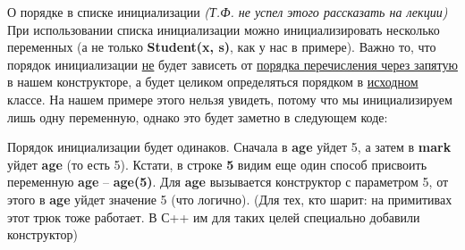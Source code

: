 \begin{lecture}[\lectureSubject]
\begin{lecSection}
			\begin{lecSubsection}{О порядке в списке инициализации}
			\textit{(Т.Ф. не успел этого рассказать на лекции)} При использовании списка инициализации можно инициализировать несколько переменных (а не только \textbf{Student(x, s)}, как у нас в примере). Важно то, что порядок инициализации \underline{не} будет зависеть от \underline{порядка перечисления через запятую} в нашем конструкторе, а будет целиком определяться порядком в \underline{исходном} классе. На нашем примере этого нельзя увидеть, потому что мы инициализируем лишь одну переменную, однако это будет заметно в следующем коде:
			\end{lecSubsection}
			Порядок инициализации будет одинаков. Сначала в \textbf{age} уйдет 5, а затем в \textbf{mark} уйдет \textbf{age} (то есть 5). Кстати, в строке \textbf{5} видим еще один способ присвоить переменную \textbf{age} -- \textbf{age(5)}. Для \textbf{age} вызывается конструктор с параметром 5, от этого в \textbf{age} уйдет значение 5 (что логично). (Для тех, кто шарит: на примитивах этот трюк тоже работает. В С++ им для таких целей специально добавили конструктор)
		
	\end{lecSection}
\end{lecture}

\renewcommand{\mainFolder}{/home/aleksei/github_projects/latex_works/informatics/3sem}
\renewcommand{\myFolder}{\mainFolder/lecture_\arabic{lectureNo}/}

\renewcommand{\lectureSubject}{Виртуальные методы}
%



